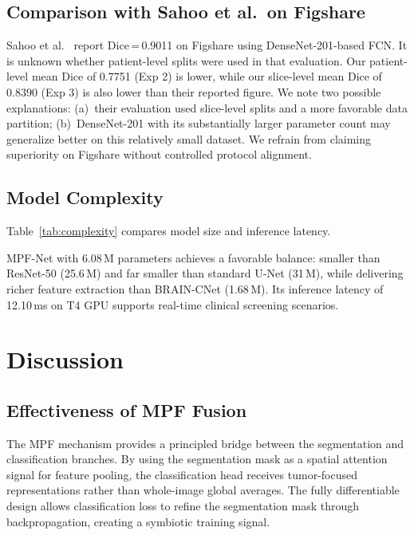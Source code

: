 \documentclass[journal]{IEEEtran}
\begin{document}
\subsection{Comparison with Sahoo et al.\ on Figshare}
Sahoo et al.~\cite{sahoo2023brain} report Dice\,=\,0.9011 on Figshare using
DenseNet-201-based FCN. It is unknown whether patient-level splits were used
in that evaluation. Our patient-level mean Dice of 0.7751 (Exp 2) is lower,
while our slice-level mean Dice of 0.8390 (Exp 3) is also lower than their
reported figure. We note two possible explanations: (a)~their evaluation used
slice-level splits and a more favorable data partition; (b)~DenseNet-201 with
its substantially larger parameter count may generalize better on this relatively
small dataset. We refrain from claiming superiority on Figshare without
controlled protocol alignment.

\subsection{Model Complexity}
Table~\ref{tab:complexity} compares model size and inference latency.



MPF-Net with 6.08\,M parameters achieves a favorable balance: smaller than
ResNet-50 (25.6\,M) and far smaller than standard U-Net (31\,M), while
delivering richer feature extraction than BRAIN-CNet (1.68\,M). Its inference
latency of 12.10\,ms on T4 GPU supports real-time clinical screening scenarios.

\section{Discussion}
\label{sec:discuss}

\subsection{Effectiveness of MPF Fusion}
The MPF mechanism provides a principled bridge between the segmentation and
classification branches. By using the segmentation mask as a spatial attention
signal for feature pooling, the classification head receives tumor-focused
representations rather than whole-image global averages. The fully
differentiable design allows classification loss to refine the segmentation
mask through backpropagation, creating a symbiotic training signal.
\end{document}
